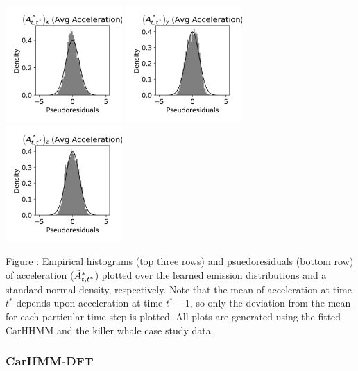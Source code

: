 \documentclass{article}
\begin{document}
\begin{center}
        \includegraphics[width=1.75in]{../Plots/CarHHMM1_psedoresids_Ax.png}
        \includegraphics[width=1.75in]{../Plots/CarHHMM1_psedoresids_Ay.png}
        \includegraphics[width=1.75in]{../Plots/CarHHMM1_psedoresids_Az.png}
        \end{center}
        
        \noindent Figure : Empirical histograms (top three rows) and psuedoresiduals (bottom row) of acceleration ($\tilde{A}^*_{t,t^*}$) plotted over the learned emission distributions and a standard normal density, respectively. Note that the mean of acceleration at time $t^*$ depends upon acceleration at time $t^*-1$, so only the deviation from the mean for each particular time step is plotted. All plots are generated using the fitted CarHHMM and the killer whale case study data.
        \addtocounter{fignum}{1}
        
        \newpage
        
        \subsubsection{CarHMM-DFT}
        
\end{document}
